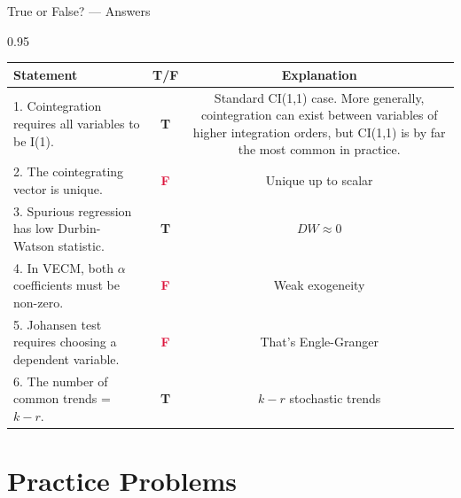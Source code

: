 \documentclass[9pt, aspectratio=169, t]{beamer}
\begin{document}
\begin{frame}{True or False? --- Answers}
    \begin{cminipage}{0.95\textwidth}
    \scriptsize
    \begin{center}
    \begin{tabular}{p{7.5cm}cc}
        \toprule
        \textbf{Statement} & \textbf{T/F} & \textbf{Explanation} \\
        \midrule
        1. Cointegration requires all variables to be I(1). & \textcolor{Forest}{\textbf{T}} & {\tiny Standard CI(1,1) case. More generally, cointegration can exist between variables of higher integration orders, but CI(1,1) is by far the most common in practice.} \\[0.08cm]
        2. The cointegrating vector is unique. & \textcolor{Crimson}{\textbf{F}} & {\tiny Unique up to scalar} \\[0.08cm]
        3. Spurious regression has low Durbin-Watson statistic. & \textcolor{Forest}{\textbf{T}} & {\tiny $DW \approx 0$} \\[0.08cm]
        4. In VECM, both $\alpha$ coefficients must be non-zero. & \textcolor{Crimson}{\textbf{F}} & {\tiny Weak exogeneity} \\[0.08cm]
        5. Johansen test requires choosing a dependent variable. & \textcolor{Crimson}{\textbf{F}} & {\tiny That's Engle-Granger} \\[0.08cm]
        6. The number of common trends = $k - r$. & \textcolor{Forest}{\textbf{T}} & {\tiny $k-r$ stochastic trends} \\
        \bottomrule
    \end{tabular}
    \end{center}
    \end{cminipage}
\end{frame}

\section{Practice Problems}
\end{document}

